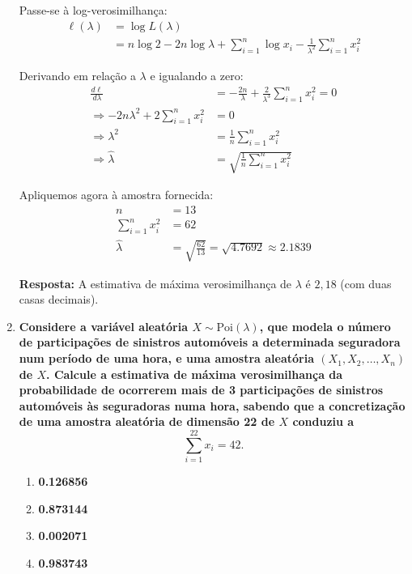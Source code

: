 \documentclass[a4paper,12pt]{article}
\begin{document}
\begin{enumerate}
\begin{mdframed}[backgroundcolor=gray!10, linewidth=0pt, innertopmargin=10pt, innerbottommargin=10pt]
    Passe-se à log-verosimilhança:
    \begin{align*}
    \ell(\lambda) &= \log L(\lambda) \\
    &= n \log 2 - 2n \log \lambda + \sum_{i=1}^n \log x_i - \frac{1}{\lambda^2} \sum_{i=1}^n x_i^2
    \end{align*}

    Derivando em relação a \( \lambda \) e igualando a zero:
    \begin{align*}
    \frac{d\ell}{d\lambda} &= -\frac{2n}{\lambda} + \frac{2}{\lambda^3} \sum_{i=1}^n x_i^2 = 0 \\
    \Rightarrow -2n\lambda^2 + 2 \sum_{i=1}^n x_i^2 &= 0 \\
    \Rightarrow \lambda^2 &= \frac{1}{n} \sum_{i=1}^n x_i^2 \\
    \Rightarrow \hat{\lambda} &= \sqrt{\frac{1}{n} \sum_{i=1}^n x_i^2}
    \end{align*}

    Apliquemos agora à amostra fornecida:
    \begin{align*}
    n &= 13 \\
    \sum_{i=1}^n x_i^2 &= 62 \\
    \hat{\lambda} &= \sqrt{\frac{62}{13}} = \sqrt{4.7692} \approx 2.1839
    \end{align*}

    \textbf{Resposta:} A estimativa de máxima verosimilhança de \( \lambda \) é \( 2{,}18 \) (com duas casas decimais).
    \end{mdframed}

    \vspace{0.5cm}

    \item \textbf{Considere a variável aleatória \( X \sim \text{Poi}(\lambda) \), que modela o número de participações de sinistros automóveis a determinada seguradora num período de uma hora, e uma amostra aleatória \((X_1, X_2, \ldots, X_n)\) de \(X\). Calcule a estimativa de máxima verosimilhança da probabilidade de ocorrerem mais de 3 participações de sinistros automóveis às seguradoras numa hora, sabendo que a concretização de uma amostra aleatória de dimensão 22 de \(X\) conduziu a}  
    \[
    \sum_{i=1}^{22} x_i = 42.
    \]

    \begin{enumerate}[label=\alph*)]
        \item \textbf{0.126856}
        \item \textbf{0.873144}
        \item \textbf{0.002071}
        \item \textbf{0.983743}
    \end{enumerate}


\end{enumerate}
\end{document}
